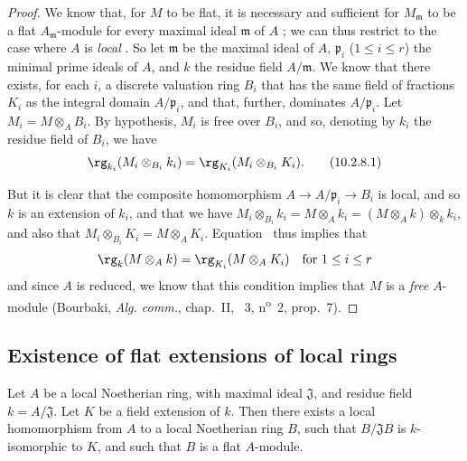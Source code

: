 \begin{proof}
We know that, for $M$ to be flat, it is necessary and sufficient for $M_\mathfrak{m}$ to be a flat $A_\mathfrak{m}$-module for every maximal ideal $\mathfrak{m}$ of $A$ ;
we can thus restrict to the case where $A$ is \emph{local} .
So let $\mathfrak{m}$ be the maximal ideal of $A$, $\mathfrak{p}_i$ ($1\leq i\leq r$) the minimal prime ideals of $A$, and $k$ the residue field $A/\mathfrak{m}$.
We know  that there exists, for each $i$, a discrete valuation ring $B_i$ that has the same field of fractions $K_i$ as the integral domain $A/\mathfrak{p}_i$, and that, further, dominates $A/\mathfrak{p}_i$.
Let $M_i=M\otimes_A B_i$.
By hypothesis, $M_i$ is free over $B_i$, and so, denoting by $k_i$ the residue field of $B_i$, we have
\[
\label{0.10.2.8.1}
  \rg_{k_i}(M_i\otimes_{B_i}k_i)=\rg_{K_i}(M_i\otimes_{B_i}K_i).
  \tag{10.2.8.1}
\]

But it is clear that the composite homomorphism $A\to A/\mathfrak{p}_i\to B_i$ is local, and so $k$ is an extension of $k_i$, and that we have $M_i\otimes_{B_i}k_i = M\otimes_A k_i = (M\otimes_A k)\otimes_k k_i$, and also that $M_i\otimes_{B_i}K_i = M\otimes_A K_i$.
Equation~ thus implies that
\[
  \rg_k(M\otimes_A k)=\rg_{K_i}(M\otimes_A K_i)\quad\mbox{for $1\leq i\leq r$}
\]
and since $A$ is reduced, we know that this condition implies that $M$ is a \emph{free} $A$-module (Bourbaki, \emph{Alg. comm.}, chap.~II, \textsection~3, n\textsuperscript{o}~2, prop.~7).
\end{proof}

\subsection{Existence of flat extensions of local rings}
\label{subsection:0.10.3}

\begin{proposition}[10.3.1]
\label{0.10.3.1}
Let $A$ be a local Noetherian ring, with maximal ideal $\mathfrak{J}$, and residue field $k=A/\mathfrak{J}$.
Let $K$ be a field extension of $k$.
Then there exists a local homomorphism from $A$ to a local Noetherian ring $B$, such that $B/\mathfrak{J}B$ is $k$-isomorphic to $K$, and such that $B$ is a flat $A$-module.
\end{proposition}

